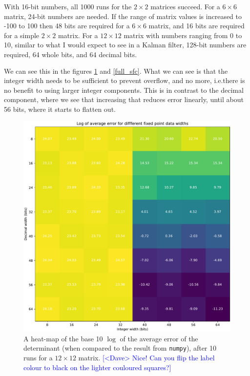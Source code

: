 \documentclass[12pt]{article}
\newcommand{\note}[2][red]{\textcolor{#1}{#2}}
\newcommand{\notedme}[1]{\note[blue]{[<Dave> #1]}}
\begin{document}


With 16-bit numbers, all 1000 runs for the $2\times2$ matrices succeed. For a $6\times6$ matrix, 24-bit numbers are needed. If the range of matrix values is increased to -100 to 100 then 48 bits are required for a $6\times6$ matrix, and 16 bits are required for a simple $2\times2$ matrix. For a $12\times12$ matrix with numbers ranging from 0 to 10, similar to what I would expect to see in a Kalman filter, 128-bit numbers are required, 64 whole bits, and 64 decimal bits.

We can see this in the figures \ref{full_heat} and \ref{full_sfc}. What we can see is that the integer width needs to be sufficient to prevent overflow, and no more, i.e.\@ there is no benefit to using larger integer components. This is in contrast to the decimal component, where we see that increasing that reduces error linearly, until about 56 bits, where it starts to flatten out.

\begin{figure}[thp]
	\centering
	
	\includegraphics[width=\textwidth]{heatmap_full.pdf}
	
	\caption{A heat-map of the base 10 $\log$ of the average error of the determinant (when compared to the result from \lstinline|numpy|), after 10 runs for a $12 \times 12$ matrix. \notedme{Nice! Can you flip the label colour to black on the lighter couloured squares?}}
	\label{full_heat}
\end{figure}
\end{document}
